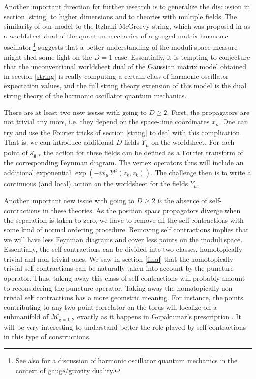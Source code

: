 \documentclass[11pt]{JHEP3}
\def\gg{\mathsf g }
\begin{document}
Another important direction for further research is to generalize the discussion
in section \ref{string} to higher dimensions and to theories with multiple fields.
The similarity of our model to the Itzhaki-McGreevy string, which was proposed in \cite{Itzhaki:2004te} as a worldsheet
dual of the quantum mechanics of a gauged matrix harmonic oscillator,\footnote{See also \cite{Berenstein:2004kk} for a discussion of harmonic oscillator quantum mechanics 
in the context of gauge/gravity duality.} suggests that 
a better understanding of the moduli space measure might shed some light on the $D=1$ case.
Essentially, it is tempting to conjecture that the unconventional worldsheet dual of the Gaussian
 matrix model obtained in section \ref{string} is really computing a certain class of harmonic oscillator expectation values, and the full string theory extension of this model is  
the dual string theory of the harmonic oscillator quantum mechanics.

There are at least two new issues with going to $D\geq 2$. First, the propagators
are not trivial any more, i.e. they depend on the space-time coordinates $x_\mu$. One can
try and use the Fourier tricks of section \ref{string} to deal with this complication. That is, we can introduce additional $D$ fields $Y_\mu$ on the worldsheet. 
For each point of ${\mathcal S}_{\gg,s}$ the action for these fields can be defined
as a Fourier transform of the corresponding Feynman diagram. The vertex operators thus
will include an additional exponential $\exp(-ix_\mu\,Y^\mu(z_k,\bar z_k))$. The challenge then is to write a continuous (and local) action on the worldsheet for the fields $Y_\mu$.      

Another important new issue with going to $D\geq2$ is the absence of self-contractions 
in these theories. As the position space propagators diverge when the separation is
taken to zero, we have to remove all the self contractions with some kind of normal ordering procedure. 
Removing self contractions implies that we will have less Feynman diagrams and  cover
less points on the moduli space. Essentially, the self contractions can be divided into two
classes, homotopically trivial and non trivial ones. We saw in section \ref{final} that the
homotopically trivial self contractions can be naturally taken into account by the puncture
operator. Thus, taking away this class of self  contractions will probably amount
to reconsidering the puncture operator. Taking away the homotopically non trivial 
self contractions has a more geometric meaning. For instance, the points contributing to any
two point correlator on the torus will localize on a submanifold of ${\mathcal M}_{\gg=1,2}$
exactly as it happens in Gopakumar's prescription 
\cite{Aharony:2006th}. It will be very interesting to understand better the role
played by self contractions in this type of constructions. 
\end{document}
